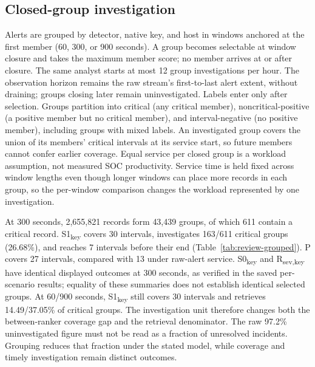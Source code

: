 \documentclass[pdflatex,sn-basic,Numbered]{sn-jnl}
\newcommand{\key}{\textsubscript{key}}
\newcommand{\Rsev}{R\textsubscript{sev,key}}
\begin{document}
\subsection{Closed-group investigation}
Alerts are grouped by detector, native key, and host in windows anchored at the first member (60, 300, or 900 seconds). A group becomes selectable at window closure and takes the maximum member score; no member arrives at or after closure. The same analyst starts at most 12 group investigations per hour. The observation horizon remains the raw stream's first-to-last alert extent, without draining; groups closing later remain uninvestigated. Labels enter only after selection. Groups partition into critical (any critical member), noncritical-positive (a positive member but no critical member), and interval-negative (no positive member), including groups with mixed labels. An investigated group covers the union of its members' critical intervals at its service start, so future members cannot confer earlier coverage. Equal service per closed group is a workload assumption, not measured SOC productivity. Service time is held fixed across window lengths even though longer windows can place more records in each group, so the per-window comparison changes the workload represented by one investigation.

At 300 seconds, 2,655,821 records form 43,439 groups, of which 611 contain a critical record. S1\key{} covers 30 intervals, investigates 163/611 critical groups (26.68\%), and reaches 7 intervals before their end (Table~\ref{tab:review-grouped}). P covers 27 intervals, compared with 13 under raw-alert service. S0\key{} and \Rsev{} have identical displayed outcomes at 300 seconds, as verified in the saved per-scenario results; equality of these summaries does not establish identical selected groups. At 60/900 seconds, S1\key{} still covers 30 intervals and retrieves 14.49/37.05\% of critical groups. The investigation unit therefore changes both the between-ranker coverage gap and the retrieval denominator. The raw 97.2\% uninvestigated figure must not be read as a fraction of unresolved incidents. Grouping reduces that fraction under the stated model, while coverage and timely investigation remain distinct outcomes.
\end{document}
